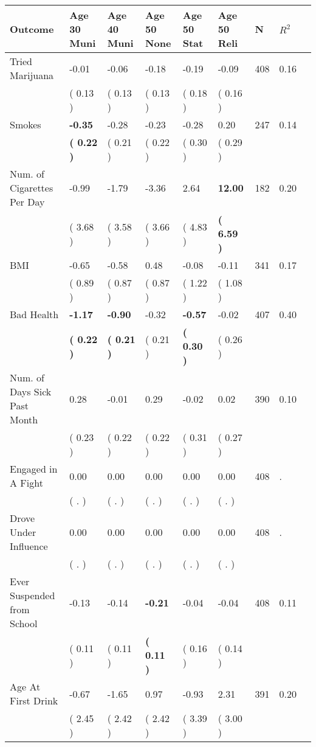 \begin{tabular}{L{6.2cm} C{1.8cm} C{1.8cm} C{1.8cm} C{1.8cm} C{1.8cm} C{1.8cm} C{0.3cm} C{0.3cm}}
\toprule
 \textbf{Outcome} & \textbf{Age 30 Muni} & \textbf{Age 40 Muni} & \textbf{Age 50 None} & \textbf{Age 50 Stat} & \textbf{Age 50 Reli} & \textbf{N} & \textbf{$ R^2$} \\
\midrule
Tried Marijuana &     -0.01 &     -0.06 &     -0.18 &     -0.19 &     -0.09  & 408 &       0.16 \\ 
 & (     0.13 ) & (     0.13 ) & (     0.13 ) & (     0.18 ) & (     0.16 )  & \\
Smokes & \textbf{    -0.35} &     -0.28 &     -0.23 &     -0.28 &      0.20  & 247 &       0.14 \\ 
 & \textbf{(     0.22 )} & (     0.21 ) & (     0.22 ) & (     0.30 ) & (     0.29 )  & \\
Num. of Cigarettes Per Day &     -0.99 &     -1.79 &     -3.36 &      2.64 & \textbf{    12.00}  & 182 &       0.20 \\ 
 & (     3.68 ) & (     3.58 ) & (     3.66 ) & (     4.83 ) & \textbf{(     6.59 )}  & \\
BMI &     -0.65 &     -0.58 &      0.48 &     -0.08 &     -0.11  & 341 &       0.17 \\ 
 & (     0.89 ) & (     0.87 ) & (     0.87 ) & (     1.22 ) & (     1.08 )  & \\
Bad Health & \textbf{    -1.17} & \textbf{    -0.90} &     -0.32 & \textbf{    -0.57} &     -0.02  & 407 &       0.40 \\ 
 & \textbf{(     0.22 )} & \textbf{(     0.21 )} & (     0.21 ) & \textbf{(     0.30 )} & (     0.26 )  & \\
Num. of Days Sick Past Month &      0.28 &     -0.01 &      0.29 &     -0.02 &      0.02  & 390 &       0.10 \\ 
 & (     0.23 ) & (     0.22 ) & (     0.22 ) & (     0.31 ) & (     0.27 )  & \\
Engaged in A Fight &      0.00 &      0.00 &      0.00 &      0.00 &      0.00  & 408 &          . \\ 
 & (        . ) & (        . ) & (        . ) & (        . ) & (        . )  & \\
Drove Under Influence &      0.00 &      0.00 &      0.00 &      0.00 &      0.00  & 408 &          . \\ 
 & (        . ) & (        . ) & (        . ) & (        . ) & (        . )  & \\
Ever Suspended from School &     -0.13 &     -0.14 & \textbf{    -0.21} &     -0.04 &     -0.04  & 408 &       0.11 \\ 
 & (     0.11 ) & (     0.11 ) & \textbf{(     0.11 )} & (     0.16 ) & (     0.14 )  & \\
Age At First Drink &     -0.67 &     -1.65 &      0.97 &     -0.93 &      2.31  & 391 &       0.20 \\ 
 & (     2.45 ) & (     2.42 ) & (     2.42 ) & (     3.39 ) & (     3.00 )  & \\
\bottomrule
\end{tabular}

